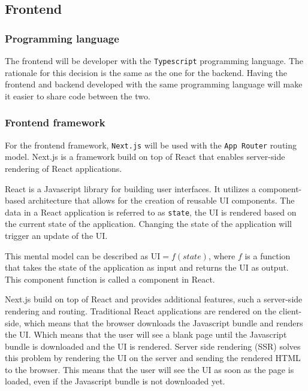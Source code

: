 \documentclass[../main.tex]{subfiles}
\begin{document}

\subsection{Frontend}

\subsubsection{Programming language}

The frontend will be developer with the \texttt{Typescript} programming language.
The rationale for this decision is the same as the one for the backend.
Having the frontend and backend developed with the same programming language will make it easier to share code between the two.

\subsubsection{Frontend framework}

For the frontend framework, \texttt{Next.js} \cite{nextjs} will be used with the \texttt{App Router} \cite{nextjs-app-router}
routing model. Next.js is a framework build on top of React \cite{react} that enables server-side rendering of React applications.

React is a Javascript library for building user interfaces. It utilizes a component-based architecture that allows for the creation of reusable UI components.
The data in a React application is referred to as \texttt{state}, the UI is rendered based on the current state of the application.
Changing the state of the application will trigger an update of the UI.

This mental model can be described as $\mathrm{UI} = f(state)$, where $f$ is a function that takes the state of the application as input and returns the UI as output.
This component function is called a component in React.

Next.js build on top of React and provides additional features, such a server-side rendering and routing.
Traditional React applications are rendered on the client-side, which means that the browser downloads the Javascript bundle and renders the UI.
Which means that the user will see a blank page until the Javascript bundle is downloaded and the UI is rendered.
Server side rendering (SSR) solves this problem by rendering the UI on the server and sending the rendered HTML to the browser.
This means that the user will see the UI as soon as the page is loaded, even if the Javascript bundle is not downloaded yet.
\end{document}
